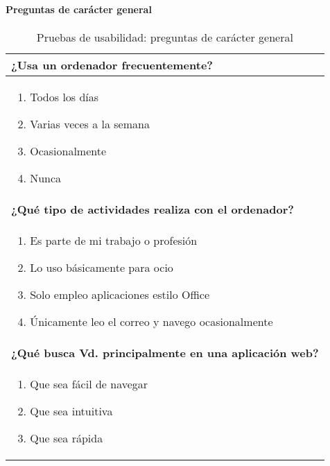\paragraph*{Preguntas de carácter general}
\begin{table}[H]
\centering
\caption{Pruebas de usabilidad: preguntas de carácter general}
\begin{tabular}{p{36em}}
\toprule
\rowcolor[rgb]{ .949,  .949,  .949} \textbf{¿Usa un ordenador frecuentemente?} \\ \midrule
\vspace{-4mm}
\begin{enumerate}
\item Todos los días
\item Varias veces a la semana
\item Ocasionalmente
\item Nunca
\end{enumerate} \\ \midrule
\rowcolor[rgb]{ .949,  .949,  .949} \textbf{¿Qué tipo de actividades realiza con el ordenador?} \\ \midrule
\vspace{-4mm}
\begin{enumerate}
\item Es parte de mi trabajo o profesión
\item Lo uso básicamente para ocio
\item Solo empleo aplicaciones estilo Office
\item Únicamente leo el correo y navego ocasionalmente
\end{enumerate} \\ \midrule
\rowcolor[rgb]{ .949,  .949,  .949} \textbf{¿Qué busca Vd. principalmente en una aplicación web?} \\ \midrule
\vspace{-4mm}
\begin{enumerate}
\item Que sea fácil de navegar
\item Que sea intuitiva
\item Que sea rápida
\end{enumerate} \\ \bottomrule
\end{tabular}
\end{table}

